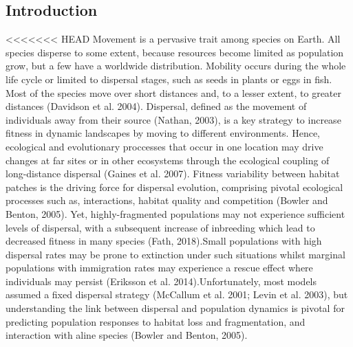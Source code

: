 \documentclass[12pt]{article}
\begin{document}
\begin{flushleft}
{{{{{\section{Introduction}
<<<<<<< HEAD
Movement is a pervasive trait among species on Earth. All species
disperse to some extent, because resources become limited as
population grow, but a few have a worldwide distribution. Mobility
occurs during the whole life cycle or limited to dispersal stages,
such as seeds in plants or eggs in fish. Most of the species move over
short distances and, to a lesser extent, to greater distances
(Davidson et al. 2004). Dispersal, defined as the movement of
individuals away from their source (Nathan, 2003), is a key strategy
to increase fitness in dynamic landscapes by moving to different
environments. Hence, ecological and evolutionary proccesses that occur
in one location may drive changes at far sites or in other ecosystems
through the ecological coupling of long-distance dispersal (Gaines et
al. 2007). Fitness variability between habitat patches is the driving
force for dispersal evolution, comprising pivotal ecological processes
such as, interactions, habitat quality and competition (Bowler and
Benton, 2005). Yet, highly-fragmented populations may not experience
sufficient levels of dispersal, with a subsequent increase of
inbreeding which lead to decreased fitness in many species (Fath,
2018).Small populations with high dispersal rates may be prone to
extinction under such situations whilst marginal populations with
immigration rates may experience a rescue effect where individuals may
persist (Eriksson et al. 2014).Unfortunately, most models assumed a
fixed dispersal strategy (McCallum et al. 2001; Levin et al. 2003),
but understanding the link between dispersal and population dynamics
is pivotal for predicting population responses to habitat loss and
fragmentation, and interaction with aline species (Bowler and Benton,
2005).

}}}}}
\end{flushleft}
\end{document}
